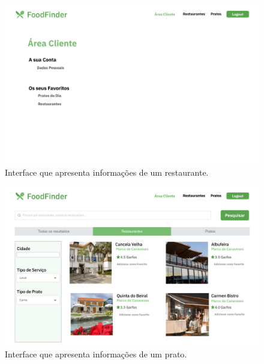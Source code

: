 \documentclass[a4paper,12pt]{report}
\begin{document}
	
	\begin{figure}[H]
	\begin{center}
	\includegraphics[scale=0.25]{6.1-Screen13}	
	\end{center}
	\caption{Interface que apresenta informações de um restaurante.}
	\end{figure} 
	
	\begin{figure}[H]
	\begin{center}
	\includegraphics[scale=0.25]{14.1-Screen14}	
	\end{center}
	\caption{Interface que apresenta informações de um prato.}
	\end{figure}
	
\end{document}
